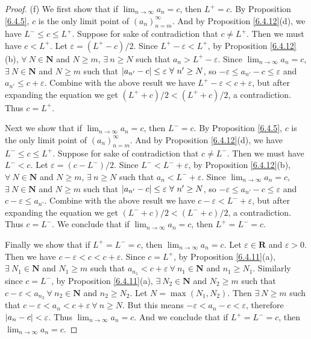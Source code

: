 \begin{proof}{(f)}
We first show that if \(\lim_{n \to \infty} a_n = c\), then \(L^+ = c\).
By Proposition \ref{6.4.5}, \(c\) is the only limit point of \((a_n)_{n = m}^\infty\).
And by Proposition \ref{6.4.12}(d), we have \(L^- \leq c \leq L^+\).
Suppose for sake of contradiction that \(c \neq L^+\).
Then we must have \(c < L^+\).
Let \(\varepsilon = (L^+ - c) / 2\).
Since \(L^+ - \varepsilon < L^+\), by Proposition \ref{6.4.12}(b), \(\forall\ N \in \mathbf{N}\) and \(N \geq m\), \(\exists\ n \geq N\) such that \(a_n > L^+ - \varepsilon\).
Since \(\lim_{n \to \infty} a_n = c\), \(\exists\ N \in \mathbf{N}\) and \(N \geq m\) such that \(\abs*{a_{n'} - c} \leq \varepsilon \ \forall\ n' \geq N\), so \(-\varepsilon \leq a_{n'} - c \leq \varepsilon\) and \(a_{n'} \leq c + \varepsilon\).
Combine with the above result we have \(L^+ - \varepsilon < c + \varepsilon\), but after expanding the equation we get \((L^+ + c) / 2 < (L^+ + c) / 2\), a contradiction.
Thus \(c = L^+\).

Next we show that if \(\lim_{n \to \infty} a_n = c\), then \(L^- = c\).
By Proposition \ref{6.4.5}, \(c\) is the only limit point of \((a_n)_{n = m}^\infty\).
And by Proposition \ref{6.4.12}(d), we have \(L^- \leq c \leq L^+\).
Suppose for sake of contradiction that \(c \neq L^-\).
Then we must have \(L^- < c\).
Let \(\varepsilon = (c - L^-) / 2\).
Since \(L^- < L^- + \varepsilon\), by Proposition \ref{6.4.12}(b), \(\forall\ N \in \mathbf{N}\) and \(N \geq m\), \(\exists\ n \geq N\) such that \(a_n < L^- + \varepsilon\).
Since \(\lim_{n \to \infty} a_n = c\), \(\exists\ N \in \mathbf{N}\) and \(N \geq m\) such that \(\abs*{a_{n'} - c} \leq \varepsilon \ \forall\ n' \geq N\), so \(-\varepsilon \leq a_{n'} - c \leq \varepsilon\) and \(c - \varepsilon \leq a_{n'}\).
Combine with the above result we have \(c - \varepsilon < L^- + \varepsilon\), but after expanding the equation we get \((L^- + c) / 2 < (L^- + c) / 2\), a contradiction.
Thus \(c = L^-\).
We conclude that if \(\lim_{n \to \infty} a_n = c\), then \(L^+ = L^- = c\).

Finally we show that if \(L^+ = L^- = c\), then \(\lim_{n \to \infty} a_n = c\).
Let \(\varepsilon \in \mathbf{R}\) and \(\varepsilon > 0\).
Then we have \(c - \varepsilon < c < c + \varepsilon\).
Since \(c = L^+\), by Proposition \ref{6.4.11}(a), \(\exists\ N_1 \in \mathbf{N}\) and \(N_1 \geq m\) such that \(a_{n_1} < c + \varepsilon \ \forall\ n_1 \in \mathbf{N}\) and \(n_1 \geq N_1\).
Similarly since \(c = L^-\), by Proposition \ref{6.4.11}(a), \(\exists\ N_2 \in \mathbf{N}\) and \(N_2 \geq m\) such that \(c - \varepsilon < a_{n_2} \ \forall\ n_2 \in \mathbf{N}\) and \(n_2 \geq N_2\).
Let \(N = \max(N_1, N_2)\).
Then \(\exists\ N \geq m\) such that \(c - \varepsilon < a_n < c + \varepsilon \ \forall\ n \geq N\).
But this means \(-\varepsilon < a_n - c < \varepsilon\), therefore \(\abs*{a_n - c} < \varepsilon\).
Thus \(\lim_{n \to \infty} a_n = c\).
And we conclude that if \(L^+ = L^- = c\), then \(\lim_{n \to \infty} a_n = c\).
\end{proof}


